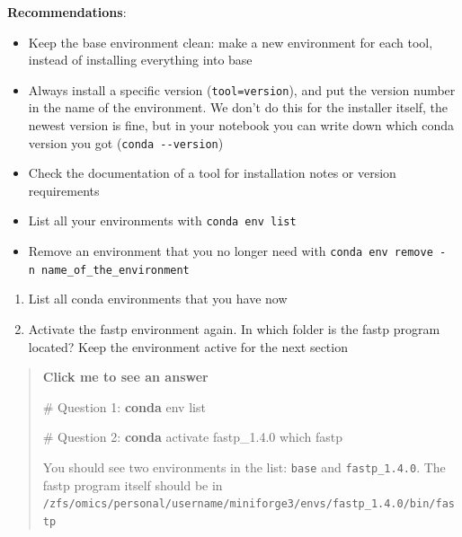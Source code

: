 \documentclass[
  letterpaper,
  DIV=11,
  numbers=noendperiod]{scrreprt}
\newenvironment{Shaded}{}{}
\newcommand{\CommentTok}[1]{\textcolor[rgb]{0.42,0.45,0.49}{#1}}
\newcommand{\ExtensionTok}[1]{\textcolor[rgb]{0.84,0.23,0.29}{\textbf{#1}}}
\newcommand{\FunctionTok}[1]{\textcolor[rgb]{0.44,0.26,0.76}{#1}}
\newcommand{\NormalTok}[1]{\textcolor[rgb]{0.14,0.16,0.18}{#1}}
\providecommand{\tightlist}{%
  \setlength{\itemsep}{0pt}\setlength{\parskip}{0pt}}
\begin{document}
\textbf{Recommendations}:

\begin{itemize}
\tightlist
\item
  Keep the base environment clean: make a new environment for each tool,
  instead of installing everything into base
\item
  Always install a specific version (\texttt{tool=version}), and put the
  version number in the name of the environment. We don't do this for
  the installer itself, the newest version is fine, but in your notebook
  you can write down which conda version you got
  (\texttt{conda\ -\/-version})
\item
  Check the documentation of a tool for installation notes or version
  requirements
\item
  List all your environments with \texttt{conda\ env\ list}
\item
  Remove an environment that you no longer need with
  \texttt{conda\ env\ remove\ -n\ name\_of\_the\_environment}
\end{itemize}

\begin{tcolorbox}[enhanced jigsaw, colbacktitle=quarto-callout-color!10!white, rightrule=.15mm, leftrule=.75mm, colback=white, opacitybacktitle=0.6, title=\textcolor{quarto-callout-color}{\faInfo}\hspace{0.5em}{Exercise}, bottomrule=.15mm, left=2mm, colframe=quarto-callout-color-frame, opacityback=0, breakable, bottomtitle=1mm, coltitle=black, arc=.35mm, toprule=.15mm, toptitle=1mm, titlerule=0mm]

\begin{enumerate}
\def\labelenumi{\arabic{enumi}.}
\tightlist
\item
  List all conda environments that you have now
\item
  Activate the fastp environment again. In which folder is the fastp
  program located? Keep the environment active for the next section
\end{enumerate}

\begin{quote}
\textbf{Click me to see an answer}

\begin{Shaded}
\begin{Highlighting}[]
\CommentTok{\# Question 1:}
\ExtensionTok{conda}\NormalTok{ env list}

\CommentTok{\# Question 2:}
\ExtensionTok{conda}\NormalTok{ activate fastp\_1.4.0}
\FunctionTok{which}\NormalTok{ fastp}
\end{Highlighting}
\end{Shaded}

You should see two environments in the list: \texttt{base} and
\texttt{fastp\_1.4.0}. The fastp program itself should be in
\texttt{/zfs/omics/personal/username/miniforge3/envs/fastp\_1.4.0/bin/fastp}
\end{quote}

\end{tcolorbox}
\end{document}
